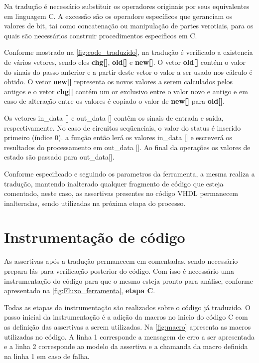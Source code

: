 \par
Na tradução é necessário substituir os operadores originais por seus equivalentes em linguagem C. A excessão são os operadore específicos que geranciam os valores de bit, tai como concatenação ou manipulação de partes verotiais, para os quais são necessários construir procedimentos especificos em C.

Conforme mostrado na \autoref{fig:code_traduzido}, na tradução é verificado a existencia de vários vetores, sendo eles \textbf{chg[]}, \textbf{old[]} e \textbf{new[]}. O vetor \textbf{old[]} contém o valor do sinais do passo anterior e a partir deste vetor o valor a ser usado nos cálculo é obtido. O vetor \textbf{new[]} representa os novos valores a serem calculados pelos antigos e o vetor \textbf{chg[]} contém um or exclusivo entre o valor novo e antigo e em caso de alteração entre os valores é copiado o valor de \textbf{new[]} para \textbf{old[]}.

\par
Os vetores in\_data [] e out\_data [] contêm os sinais de entrada e saída, respectivamente. No caso de circuitos seqüenciais, o valor do status é inserido primeiro (índice 0). a função então lerá os valores in\_data [] e escreverá os resultados do processamento em out\_data []. Ao final da operações os valores de estado são passado para out\_data[].
\par
Conforme especificado e seguindo os parametros da ferramenta, a mesma realiza a tradução, mantendo inalterado qualquer fragmento de código que esteja comentado, neste caso, as assertivas presentes no código VHDL permanecem inalteradas, sendo utilizadas na próxima etapa do processo.

\section{Instrumentação de código}

\par
As assertivas após a tradução permanecem em comentadas, sendo necessário prepara-lás para verificação posterior do código. Com isso é necessário uma instrumentação do código para que o mesmo esteja pronto para análise, conforme apresentado na \autoref{fig:Fluxo_ferramenta}, \textbf{etapa C}.

\par
Todas as etapas da instrumentação são realizados sobre o código já traduzido. O passo inicial da instrumentação é a adição da macros no inicio do código C com as definição das assertivas a serem utilizadas. Na \autoref{fig:macro} apresenta as macros utilizadas no código. A linha 1 corresponde a mensagem de erro a ser apresentada e a linha 2 corresponde ao modelo da assertiva e a chamanda da macro definida na linha 1 em caso de falha. 

